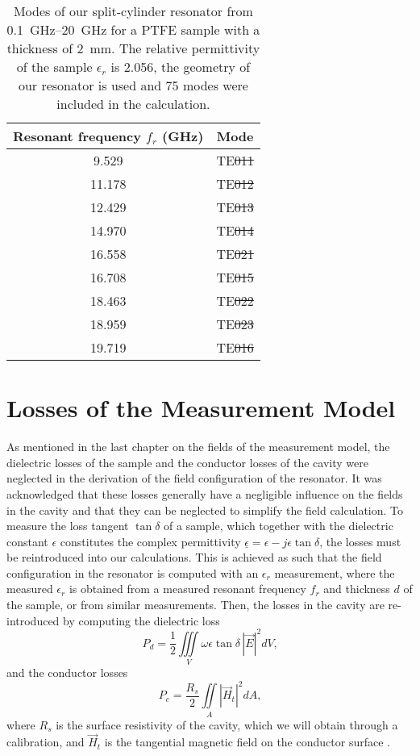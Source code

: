 \begin{table}
\centering
\begin{tabular}{|c|c|}
\hline\rule{0pt}{2.6ex}
Resonant frequency $f_r$ (\si{\giga\hertz}) & Mode \\
\hline\rule{0pt}{2.6ex}
 9.529 & TE\st{011} \\
11.178 & TE\st{012} \\
12.429 & TE\st{013} \\
14.970 & TE\st{014} \\
16.558 & TE\st{021} \\
16.708 & TE\st{015} \\
18.463 & TE\st{022} \\
18.959 & TE\st{023} \\
19.719 & TE\st{016} \\
\hline
\end{tabular}
\caption{Modes of our split-cylinder resonator from \SIrange{0.1}{20}{\giga\hertz} for a PTFE sample with a thickness of \SI{2}{\milli\meter}. The relative permittivity of the sample $\epsilon_r$ is 2.056, the geometry of our resonator is used and 75 modes were included in the calculation.}\label{tb:modes}
\end{table}
\section{Losses of the Measurement Model}\label{sec:losses}
As mentioned in the last chapter on the fields of the measurement model, the dielectric losses of the sample and the conductor losses of the cavity were neglected in the derivation of the field configuration of the resonator. It was acknowledged that these losses generally have a negligible influence on the fields in the cavity and that they can be neglected to simplify the field calculation. To measure the loss tangent $\tan\delta$ of a sample, which together with the dielectric constant $\epsilon$ constitutes the complex permittivity $\underline{\epsilon}=\epsilon-j\epsilon\tan\delta$, the losses must be reintroduced into our calculations. This is achieved as such that the field configuration in the resonator is computed with an $\epsilon_r$ measurement, where the measured $\epsilon_r$ is obtained from a measured resonant frequency $f_r$ and thickness $d$ of the sample, or from similar measurements. Then, the losses in the cavity are re-introduced by computing the dielectric loss
\begin{equation}\label{eq:d_loss}
P_d=\frac{1}{2}\iiint\limits_{\mathit{V}}\omega\epsilon\tan\delta\,|\vec{E}|^2\mathit{dV}\text{,}
\end{equation}
and the conductor losses
\begin{equation}\label{eq:c_loss}
P_c=\frac{R_s}{2}\iint\limits_{\mathit{A}}|\vec{H}_{t}|^2\mathit{dA}\text{,}
\end{equation}
where $R_s$ is the surface resistivity of the cavity, which we will obtain through a calibration, and $\vec{H}_{t}$ is the tangential magnetic field on the conductor surface \cite{pozar}.

